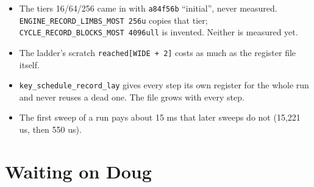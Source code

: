 \begin{itemize}
\item The tiers 16/64/256 came in with \texttt{a84f56b} “initial”, never measured. \texttt{ENGINE\_\allowbreak{}RECORD\_\allowbreak{}LIMBS\_\allowbreak{}MOST 256u} copies that tier; \texttt{CYCLE\_\allowbreak{}RECORD\_\allowbreak{}BLOCKS\_\allowbreak{}MOST 4096ull} is invented. Neither is measured yet.
\item The ladder's scratch \texttt{reached[WIDE + 2]} costs as much as the register file itself.
\item \texttt{key\_\allowbreak{}schedule\_\allowbreak{}record\_\allowbreak{}lay} gives every step its own register for the whole run and never reuses a dead one. The file grows with every step.
\item The first sweep of a run pays about 15 ms that later sweeps do not (15,221 us, then 550 us).
\end{itemize}

\section{\texorpdfstring{Waiting on Doug}{Waiting on Doug}}

